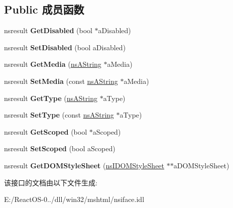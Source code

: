 \subsection*{Public 成员函数}
\begin{DoxyCompactItemize}
\item 
\mbox{\label{interfacens_i_d_o_m_h_t_m_l_style_element_a8f7e5d31cb29f8640ef485d4213a4105}} 
nsresult {\bfseries Get\+Disabled} (bool $\ast$a\+Disabled)
\item 
\mbox{\label{interfacens_i_d_o_m_h_t_m_l_style_element_adc9fcee7ef1a6f790cc2231ebbcbf16f}} 
nsresult {\bfseries Set\+Disabled} (bool a\+Disabled)
\item 
\mbox{\label{interfacens_i_d_o_m_h_t_m_l_style_element_aaacc3f3fcce7fc62b61637572db45c3a}} 
nsresult {\bfseries Get\+Media} (\hyperlink{structns_string_container}{ns\+A\+String} $\ast$a\+Media)
\item 
\mbox{\label{interfacens_i_d_o_m_h_t_m_l_style_element_a8d31a0c70a97fb763a793e4e235d38b0}} 
nsresult {\bfseries Set\+Media} (const \hyperlink{structns_string_container}{ns\+A\+String} $\ast$a\+Media)
\item 
\mbox{\label{interfacens_i_d_o_m_h_t_m_l_style_element_ac206ef540eaf29bd187ec53d2f66d7c7}} 
nsresult {\bfseries Get\+Type} (\hyperlink{structns_string_container}{ns\+A\+String} $\ast$a\+Type)
\item 
\mbox{\label{interfacens_i_d_o_m_h_t_m_l_style_element_a1b0d8c3ddff402da9e933de1ee0891d4}} 
nsresult {\bfseries Set\+Type} (const \hyperlink{structns_string_container}{ns\+A\+String} $\ast$a\+Type)
\item 
\mbox{\label{interfacens_i_d_o_m_h_t_m_l_style_element_a6162c27ed320b4ee234b7c639d543a23}} 
nsresult {\bfseries Get\+Scoped} (bool $\ast$a\+Scoped)
\item 
\mbox{\label{interfacens_i_d_o_m_h_t_m_l_style_element_a2a540a6992214d323707b6d442233c22}} 
nsresult {\bfseries Set\+Scoped} (bool a\+Scoped)
\item 
\mbox{\label{interfacens_i_d_o_m_h_t_m_l_style_element_a38ae613c157fb8412f02c9f8d1a50a7a}} 
nsresult {\bfseries Get\+D\+O\+M\+Style\+Sheet} (\hyperlink{interfacens_i_d_o_m_style_sheet}{ns\+I\+D\+O\+M\+Style\+Sheet} $\ast$$\ast$a\+D\+O\+M\+Style\+Sheet)
\end{DoxyCompactItemize}


该接口的文档由以下文件生成\+:\begin{DoxyCompactItemize}
\item 
E\+:/\+React\+O\+S-\/0../dll/win32/mshtml/nsiface.\+idl\end{DoxyCompactItemize}
